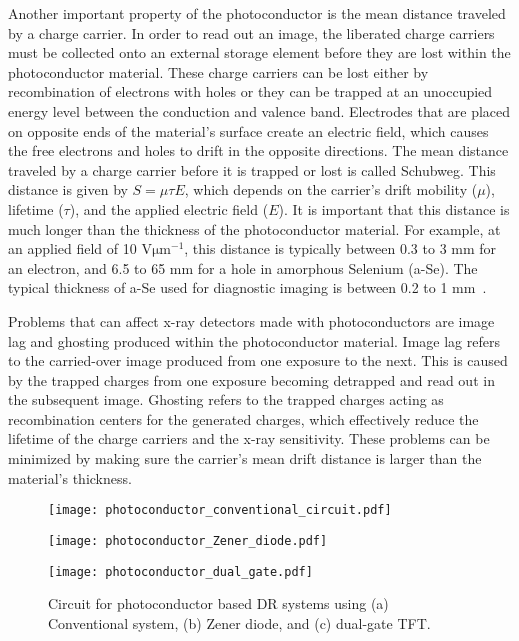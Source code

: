 Another important property of the photoconductor is the mean distance traveled by a charge carrier.  In order to read out an image, the liberated charge carriers must be collected onto an external storage element before they are lost within the photoconductor material.  These charge carriers can be lost either by recombination of electrons with holes or they can be trapped at an unoccupied energy level between the conduction and valence band.  Electrodes that are placed on opposite ends of the material's surface create an electric field, which causes the free electrons and holes to drift in the opposite directions.  The mean distance traveled by a charge carrier before it is trapped or lost is called Schubweg.  This distance is given by $S = \mu \tau E$, which depends on the carrier's drift mobility ($\mu$), lifetime ($\tau$), and the applied electric field ($E$).  It is important that this distance is much longer than the thickness of the photoconductor material.  For example, at an applied field of 10 $\mathrm{V \mu m^{-1}}$, this distance is typically between 0.3 to 3 mm for an electron, and 6.5 to 65 mm for a hole in amorphous Selenium (a-Se).  The typical thickness of a-Se used for diagnostic imaging is between 0.2 to 1 mm~\citep{Rowlands2000}.

Problems that can affect x-ray detectors made with photoconductors are image lag and ghosting produced within the photoconductor material.  Image lag refers to the carried-over image produced from one exposure to the next.  This is caused by the trapped charges from one exposure becoming detrapped and read out in the subsequent image.  Ghosting refers to the trapped charges acting as recombination centers for the generated charges, which effectively reduce the lifetime of the charge carriers and the x-ray sensitivity.  These problems can be minimized by making sure the carrier's mean drift distance is larger than the material's thickness.

\begin{figure}[h]
	\noindent \begin{minipage}[b]{0.4\textwidth}
		\centering
		\texttt{[image: photoconductor\_conventional\_circuit.pdf]}
		\subcaption{}
	\end{minipage}
	\hspace{2cm}
	\begin{minipage}[b]{0.4\textwidth}
		\centering
		\texttt{[image: photoconductor\_Zener\_diode.pdf]}
		\subcaption{}
	\end{minipage}
	
	\centering
	\begin{minipage}[b]{0.3\textwidth}
		\texttt{[image: photoconductor\_dual\_gate.pdf]}
		\subcaption{}
	\end{minipage}
	\caption{Circuit for photoconductor based DR systems using (a) Conventional system, (b) Zener diode, and (c) dual-gate TFT.}
	\label{fig:photoconductor_circuit}
\end{figure}

